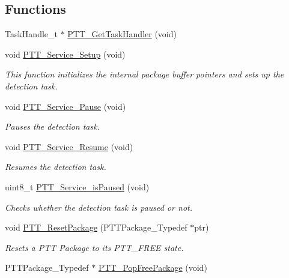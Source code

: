 \subsection*{Functions}
\begin{DoxyCompactItemize}
\item 
Task\+Handle\+\_\+t $\ast$ \hyperlink{group___p_t_t___service_ga438acb18ecae08bcac2d185a98a52177}{P\+T\+T\+\_\+\+Get\+Task\+Handler} (void)
\item 
void \hyperlink{group___p_t_t___service_gad7d3c7ba934966d4834e6609db4c13a6}{P\+T\+T\+\_\+\+Service\+\_\+\+Setup} (void)
\begin{DoxyCompactList}\small\item\em This function initializes the internal package buffer pointers and sets up the detection task. \end{DoxyCompactList}\item 
void \hyperlink{group___p_t_t___service_gadb31aa6a2786f09d8d313976c2bb5da4}{P\+T\+T\+\_\+\+Service\+\_\+\+Pause} (void)
\begin{DoxyCompactList}\small\item\em Pauses the detection task. \end{DoxyCompactList}\item 
void \hyperlink{group___p_t_t___service_ga2e11314e3f3a76f495368ea6d3eda678}{P\+T\+T\+\_\+\+Service\+\_\+\+Resume} (void)
\begin{DoxyCompactList}\small\item\em Resumes the detection task. \end{DoxyCompactList}\item 
uint8\+\_\+t \hyperlink{group___p_t_t___service_ga60ee4edcdd49ecb7eb5be5824ac798a8}{P\+T\+T\+\_\+\+Service\+\_\+is\+Paused} (void)
\begin{DoxyCompactList}\small\item\em Checks whether the detection task is paused or not. \end{DoxyCompactList}\item 
void \hyperlink{group___p_t_t___service_gace2e54f065aefa03231ef49cd220d819}{P\+T\+T\+\_\+\+Reset\+Package} (P\+T\+T\+Package\+\_\+\+Typedef $\ast$ptr)
\begin{DoxyCompactList}\small\item\em Resets a P\+TT Package to its P\+T\+T\+\_\+\+F\+R\+EE state. \end{DoxyCompactList}\item 
P\+T\+T\+Package\+\_\+\+Typedef $\ast$ \hyperlink{group___p_t_t___service_gaa7e0c4bca58c6133c9fbb281ec291ffd}{P\+T\+T\+\_\+\+Pop\+Free\+Package} (void)

\end{DoxyCompactItemize}
